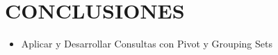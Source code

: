 \section{CONCLUSIONES} 

\begin{itemize}
	\item Aplicar y Desarrollar  Consultas con Pivot y Grouping Sets



\end{itemize}